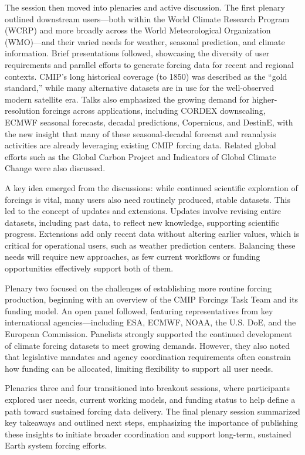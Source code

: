 \documentclass{ametsocV6.1}
\begin{document}
The session then moved into plenaries and active discussion. The first plenary outlined downstream users—both within the World Climate Research Program (WCRP) and more broadly across the World Meteorological Organization (WMO)—and their varied needs for weather, seasonal prediction, and climate information. Brief presentations followed, showcasing the diversity of user requirements and parallel efforts to generate forcing data for recent and regional contexts. CMIP’s long historical coverage (to 1850) was described as the ``gold standard,'' while many alternative datasets are in use for the well-observed modern satellite era. Talks also emphasized the growing demand for higher-resolution forcings across applications, including CORDEX downscaling, ECMWF seasonal forecasts, decadal predictions, Copernicus, and DestinE, with the new insight that many of these seasonal-decadal forecast and reanalysis activities are already leveraging existing CMIP forcing data. Related global efforts such as the Global Carbon Project \citep{friedlingstein_global_2024} and Indicators of Global Climate Change \citep{forster_indicators_2024} were also discussed.

A key idea emerged from the discussions: while continued scientific exploration of forcings is vital, many users also need routinely produced, stable datasets. This led to the concept of updates and extensions. Updates involve revising entire datasets, including past data, to reflect new knowledge, supporting scientific progress. Extensions add only recent data without altering earlier values, which is critical for operational users, such as weather prediction centers. Balancing these needs will require new approaches, as few current workflows or funding opportunities effectively support both of them.

Plenary two focused on the challenges of establishing more routine forcing production, beginning with an overview of the CMIP Forcings Task Team and its funding model. An open panel followed, featuring representatives from key international agencies—including ESA, ECMWF, NOAA, the U.S. DoE, and the European Commission. Panelists strongly supported the continued development of climate forcing datasets to meet growing demands. However, they also noted that legislative mandates and agency coordination requirements often constrain how funding can be allocated, limiting flexibility to support all user needs.

Plenaries three and four transitioned into breakout sessions, where participants explored user needs, current working models, and funding status to help define a path toward sustained forcing data delivery. The final plenary session summarized key takeaways and outlined next steps, emphasizing the importance of publishing these insights to initiate broader coordination and support long-term, sustained Earth system forcing efforts.
\end{document}
